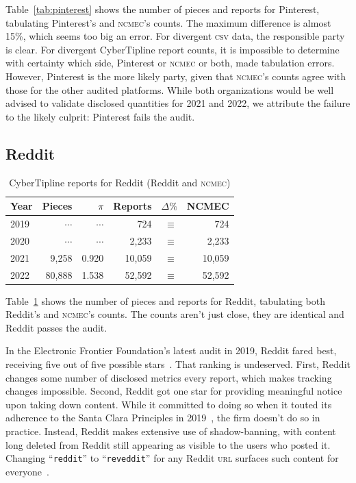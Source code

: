 \documentclass[nonacm,screen]{acmart}
\newcommand\V[1]{\textsc{\MakeLowercase{#1}}}
\begin{document}
\begin{itemize}
{\noindent{}Table~\ref{tab:pinterest} shows the number of pieces and reports for
Pinterest, tabulating Pinterest's and \V{NCMEC}'s counts. The maximum difference
is almost 15\%, which seems too big an error. For divergent \V{CSV} data, the
responsible party is clear. For divergent CyberTipline report counts, it is
impossible to determine with certainty which side, Pinterest or \V{NCMEC} or
both, made tabulation errors. However, Pinterest is the more likely party, given
that \V{NCMEC}'s counts agree with those for the other audited platforms. While
both organizations would be well advised to validate disclosed quantities for
2021 and 2022, we attribute the failure to the likely culprit: Pinterest fails
the audit.


\subsection{Reddit}

\begin{table}[h!]
\centering\libertineLF
\caption{CyberTipline reports for Reddit (Reddit and \V{NCMEC})}
\label{tab:reddit}
\begin{tabular}{l|rr|rrr}
\textbf{Year}
& \textbf{Pieces} & \textbf{$\pi$} & \textbf{Reports}
& \textbf{$\Delta\%$} & \textbf{NCMEC} \\ \hline
2019 & $\cdots$ & $\cdots$ & 724 & $\equiv$ & 724 \\
2020 & $\cdots$ & $\cdots$ & 2,233 & $\equiv$ & 2,233 \\
2021 & 9,258 & 0.920 & 10,059 & $\equiv$ & 10,059 \\
2022 & 80,888 & 1.538 & 52,592 & $\equiv$ & 52,592 \\
\end{tabular}
\end{table}

\noindent{}Table~\ref{tab:reddit} shows the number of pieces and reports for
Reddit, tabulating both Reddit's and \V{NCMEC}'s counts. The counts aren't just
close, they are identical and Reddit passes the audit.

In the Electronic Frontier Foundation's latest audit in 2019, Reddit fared best,
receiving five out of five possible stars~\cite{CrockerGebhartea2019}. That
ranking is undeserved. First, Reddit changes some number of disclosed metrics
every report, which makes tracking changes impossible. Second, Reddit got one
star for providing meaningful notice upon taking down content. While it
committed to doing so when it touted its adherence to the Santa Clara Principles
in 2019~\cite{Reddit2022}, the firm doesn't do so in practice. Instead, Reddit
makes extensive use of shadow-banning, with content long deleted from Reddit
still appearing as visible to the users who posted it. Changing
``\texttt{reddit}'' to ``\texttt{reveddit}'' for any Reddit \V{URL} surfaces
such content for everyone~\cite{Hawkins2023}.


}
\end{itemize}
\end{document}
